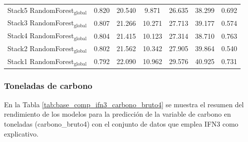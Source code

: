 \begin{table}
{\begin{tabular}{p{4.5cm}cccccc}
        Stack5 RandomForest$_{\text{global}}$ & 0.820 & 20.540 & 9.871 & 26.635 & 38.299 & 0.692 \\
        Stack3 RandomForest$_{\text{global}}$ & 0.807 & 21.266 & 10.271 & 27.713 & 39.177 & 0.574 \\
        Stack4 RandomForest$_{\text{global}}$ & 0.804 & 21.415 & 10.123 & 27.314 & 38.710 & 0.763 \\
        Stack2 RandomForest$_{\text{global}}$ & 0.802 & 21.562 & 10.342 & 27.905 & 39.864 & 0.540 \\
        Stack1 RandomForest$_{\text{global}}$ & 0.792 & 22.090 & 10.962 & 29.576 & 40.925 & 0.731 \\
            \bottomrule
    \end{tabular}
    }
\end{table}

\subsubsection{Toneladas de carbono}


En la Tabla \ref{tab:base_comp_ifn3_carbono_bruto4} se muestra el resumen del rendimiento de los modelos para la predicción de la variable de carbono en toneladas (carbono\_bruto4) con el conjunto de datos que emplea IFN3 como explicativo.

